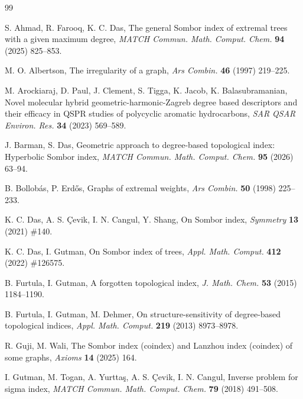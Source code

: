 \documentclass[a5paper, 10pt]{article}
\theoremstyle{plain}
\theoremstyle{remark}
\theoremstyle{definition}
\begin{document}
 \begin{thebibliography}{99}

  S. Ahmad, R. Farooq, K. C. Das, The general Sombor index of extremal
  trees with a given maximum degree, \textit{MATCH Commun. Math. Comput.
  Chem.\/} \textbf{94} (2025) 825--853.

  M. O. Albertson, The irregularity of a graph, \textit{Ars Combin.\/}
  \textbf{46} (1997) 219--225.

   M. Arockiaraj, D. Paul, J.
  Clement, S. Tigga, K. Jacob, K. Balasubramanian, Novel molecular hybrid
  geometric-harmonic-Zagreb degree based descriptors and their efficacy in
  QSPR studies of polycyclic aromatic hydrocarbons, \textit{SAR QSAR
  Environ. Res.\/} \textbf{34} (2023) 569--589.

   J. Barman, S. Das, Geometric approach to
  degree-based topological index: Hyperbolic Sombor index, \textit{MATCH
  Commun. Math. Comput. Chem.\/} \textbf{95} (2026) 63--94.

  B. Bollobás, P. Erdős, Graphs of extremal weights, \textit{Ars Combin.\/}
  \textbf{50} (1998) 225--233.

   K. C. Das, A. S. \c{C}evik, I. N.
  Cangul, Y. Shang, On Sombor index, \textit{Symmetry\/} \textbf{13}
  (2021) \#140.

   K. C. Das, I. Gutman, On Sombor index
  of trees, \textit{Appl. Math. Comput.\/} \textbf{412} (2022) \#126575.

   B. Furtula, I. Gutman, A forgotten
  topological index, \textit{J. Math. Chem.\/} \textbf{53} (2015)
  1184--1190.

   B. Furtula, I. Gutman, M. Dehmer, On
  structure-sensitivity of degree-based topological indices, \textit{Appl.
  Math. Comput.\/} \textbf{219} (2013) 8973--8978.

   R. Guji, M. Wali, The Sombor index
  (coindex) and Lanzhou index (coindex) of some graphs, \textit{Axioms\/}
  \textbf{14} (2025) 164.

   I. Gutman, M. Togan, A.
  Yurttaş, A. S. Çevik, I. N. Cangul, Inverse problem for sigma index,
  \textit{MATCH Commun. Math. Comput. Chem.\/} \textbf{79} (2018) 491--508.


\end{thebibliography}
\end{document}
